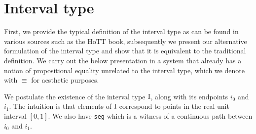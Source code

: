 \documentclass[12pt,twoside,maitrise]{dms}
\theoremstyle{definition}
\numberwithin{equation}{section}
\numberwithin{table}{chapter}
\numberwithin{figure}{chapter}
\newcommand\kw[1] {\textsf{#1}}
\newcommand\id[1] {\texttt{#1}}
\begin{document}
\section{Interval type}

First, we provide the typical definition of the interval type as can be found in
various sources such as the HoTT book\cite{HoTTbook}, subsequently we present
our alternative formulation of the interval type and show that it is equivalent
to the traditional definition. We carry out the below presentation in a system
that already has a notion of propositional equality unrelated to the interval
type, which we denote with $\equiv$ for aesthetic purposes.

\begin{prooftree*}
   \infer0{\oftype{\ctx}{\bI}{\kw{Type}}}
\end{prooftree*}

\begin{prooftree*}
\end{prooftree*}

\begin{prooftree*}
\end{prooftree*}

\begin{prooftree*}
\end{prooftree*}

We postulate the existence of the interval type $\mathrm{I}$, along with its endpoints
\id{$i_0$} and \id{$i_1$}. The intuition is that elements of $\mathrm{I}$ correspond to
points in the real unit interval $[0, 1]$. We also have \id{seg} which is a
witness of a continuous path between \id{$i_0$} and \id{$i_1$}.
\end{document}

